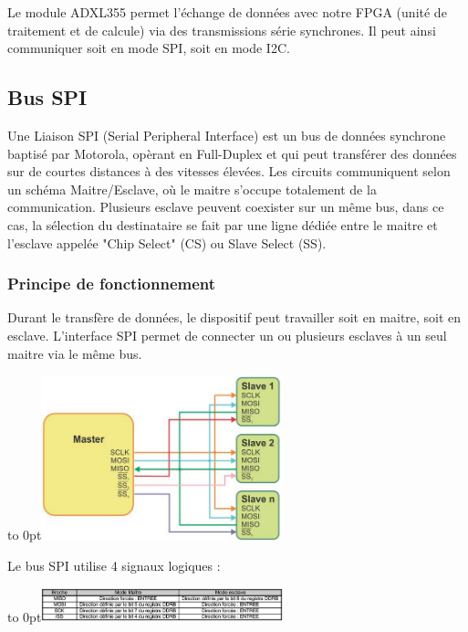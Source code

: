 \documentclass[french,a4paper,12pt]{report}
\begin{document}
Le module ADXL355 permet l'échange de données avec notre FPGA (unité de traitement et de calcule) via des transmissions série synchrones. Il peut ainsi communiquer soit en mode SPI, soit en mode I2C.

 \subsection{Bus SPI}

Une Liaison SPI (Serial Peripheral Interface) est un bus de données synchrone baptisé par Motorola, opèrant en Full-Duplex et qui peut transférer des données sur de courtes distances à des vitesses élevées. Les circuits communiquent selon un schéma Maitre/Esclave, où le maitre s'occupe totalement de la communication. Plusieurs esclave peuvent coexister sur un même bus, dans ce cas, la sélection du destinataire se fait par une ligne dédiée entre le maitre et l'esclave appelée "Chip Select" (CS) ou Slave Select (SS).

  \subsubsection{Principe de fonctionnement}

Durant le transfère de données, le dispositif peut travailler soit en maitre, soit en esclave. L'interface SPI permet de connecter un ou plusieurs esclaves à un seul maitre via le même bus.

\hfill\hbox to 0pt{\hss\includegraphics[width=7cm]{SPI1.png}\hss}\hfill\null\newline

Le bus SPI utilise 4 signaux logiques :

\hfill\hbox to 0pt{\hss\includegraphics[width=7cm]{SPI2.png}\hss}\hfill\null\newline
\end{document}
